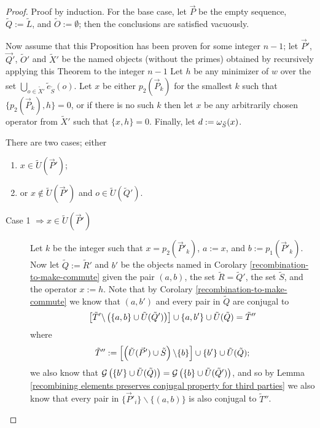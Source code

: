 \documentclass[twocolumn,showpacs,preprintnumbers,amsmath,amssymb,nofootinbib,pra,floatfix]{revtex4-1}
\newcommand{\lst}{\vec}
\newcommand{\set}{\tilde}
\newcommand{\genfun}{\mathcal{G}}
\begin{document}
\begin{proof}

Proof by induction.  For the base case, let $\lst P$ be the empty sequence, $\set Q:=\set L$, and $\set O:=\emptyset$;  then the conclusions are satisfied vacuously.

Now assume that this Proposition has been proven for some integer $n-1$;  let $\lst P'$, $\lst Q'$, $\set O'$ and $\set X'$ be the named objects (without the primes) obtained by recursively applying this Theorem to the integer $n-1$  Let $h$ be any minimizer of $w$ over the set $\bigcup_{o\in\set X'} \set e_{\set S}(o)$.  Let $x$ be either $p_2(\lst P_k)$ for the smallest $k$ such that $\{p_2(\lst P_k),h\}=0$, or if there is no such $k$ then let $x$ be any arbitrarily chosen operator from $\set X'$ such that $\{x,h\}=0$.  Finally, let  $d:=\om_{\set S}(x)$.

There are two cases;  either
\begin{enumerate}
\item $x\in \set U(\lst P')$;
\item or $x\notin \set U(\lst P')$ and $o\in\set U(\set Q')$.
\end{enumerate}

\begin{description}
\item[Case 1 $\Rightarrow x\in\set U(\lst P')$]
Let $k$ be the integer such that $x=p_2(\lst P'_k)$, $a := x$, and $b:=p_1(\lst P'_k)$.  Now let $\set Q:=\set R'$ and $b'$ be the objects named in Corolary \ref{recombination-to-make-commute} given the pair $(a,b)$, the set $\set R=\set Q'$, the set $\set S$, and the operator $x:=h$.  Note that by Corolary \ref{recombination-to-make-commute} we know that $(a,b')$ and every pair in $\set Q$ are conjugal to
$$\left[\set T'\backslash\paren{\{a,b\} \cup \set U(\set Q')}\right]\cup \{a,b'\} \cup \set U(\set Q)=\set T''$$
where
$$\set T'':=\left[\paren{\set U(\lst P')\cup \set S}\backslash\{b\}\right]\cup \{b'\} \cup \set U(\set Q);$$
we also know that $\genfun\paren{\{b'\}\cup \set U(\set Q)}=\genfun\paren{\{b\}\cup \set U(\set Q')}$, and so by Lemma \ref{recombining elements preserves conjugal property for third parties} we also know that every pair in $\{\lst P'_i\}\backslash\{(a,b)\}$ is also conjugal to $\set T''$.


\end{description}
\end{proof}
\end{document}
